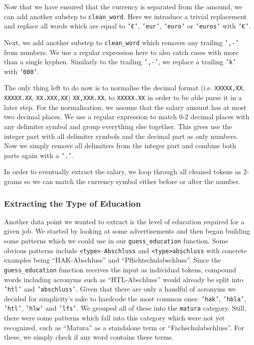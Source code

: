 \documentclass[runningheads]{llncs}
\begin{document}
Now that we have ensured that the currency is separated from the amound, we can add another substep to \texttt{clean\_word}. Here we introduce a trivial replacement and replace all words which are equal to \texttt{'€'}, \texttt{'eur'}, \texttt{'euro'} or \texttt{'euros'} with \texttt{'€'}.

Next, we add another substep to \texttt{clean\_word} which removes any trailing \texttt{',-'} from numbers. We use a regular expression here to also catch cases with more than a single hyphen. Similarly to the trailing \texttt{',-'}, we replace a trailing \texttt{'k'} with \texttt{'000'}.

The only thing left to do now is to normalise the decimal format (i.e. \texttt{XXXXX,XX}, \texttt{XXXXX.XX}, \texttt{XX.XXX,XX}) \texttt{XX,XXX.XX}, to \texttt{XXXXX.XX} in order to be able parse it in a later step. For the normalisation, we assume that the salary amount has at most two decimal places. We use a regular expression to match 0-2 decimal places with any delimiter symbol and group everything else together. This gives use the integer part with all delimiter symbols and the decimal part as only numbers. Now we simply remove all delimiters from the integer part and combine both parts again with a \texttt{'.'}.

In order to eventually extract the salary, we loop through all cleaned tokens as 2-grams so we can match the currency symbol either before or after the number.

\subsubsection{Extracting the Type of Education}
\label{subsub:extracting_the_type_of_education}

Another data point we wanted to extract is the level of education required for a given job. We started by looking at some advertisements and then began building some patterns which we could use in our \texttt{guess\_education} function. Some obvious patterns include \texttt{<type>-Abschluss} and \texttt{<type>abschluss} with concrete examples being “HAK-Abschluss” and “Pflichtschulabschluss”. Since the \texttt{guess\_education} function receives the input as individual tokens, compound words including acronyms such as “HTL-Abschluss” would already be split into \texttt{'htl'} and \texttt{'abschluss'}. Given that there are only a handful of acronyms we decided for simplicity's sake to hardcode the most common ones: \texttt{'hak'}, \texttt{'hbla'}, \texttt{'htl'}, \texttt{'hlw'} and \texttt{'lfs'}. We grouped all of these into the \texttt{matura} category. Still, there were some patterns which fall into this category which were not yet recognized, such as “Matura” as a standalone term or “Fachschulabschluss”. For these, we simply check if any word contains these terms.
\end{document}
